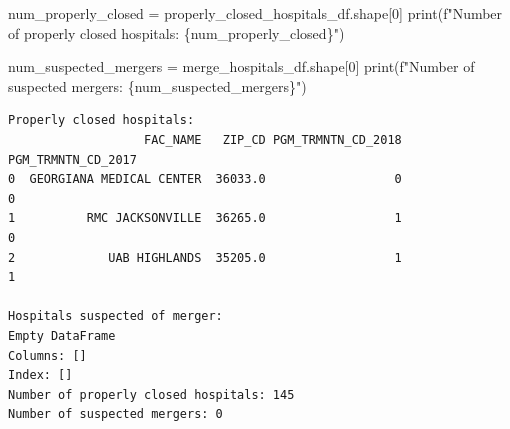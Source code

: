 \documentclass[
  letterpaper,
  DIV=11,
  numbers=noendperiod]{scrartcl}
\newenvironment{Shaded}{\begin{snugshade}}{\end{snugshade}}
\newcommand{\BuiltInTok}[1]{\textcolor[rgb]{0.00,0.23,0.31}{#1}}
\newcommand{\DecValTok}[1]{\textcolor[rgb]{0.68,0.00,0.00}{#1}}
\newcommand{\NormalTok}[1]{\textcolor[rgb]{0.00,0.23,0.31}{#1}}
\newcommand{\OperatorTok}[1]{\textcolor[rgb]{0.37,0.37,0.37}{#1}}
\newcommand{\SpecialCharTok}[1]{\textcolor[rgb]{0.37,0.37,0.37}{#1}}
\newcommand{\SpecialStringTok}[1]{\textcolor[rgb]{0.13,0.47,0.30}{#1}}
\begin{document}
\begin{Shaded}
\begin{Highlighting}[]
\NormalTok{num\_properly\_closed }\OperatorTok{=}\NormalTok{ properly\_closed\_hospitals\_df.shape[}\DecValTok{0}\NormalTok{]}
\BuiltInTok{print}\NormalTok{(}\SpecialStringTok{f"Number of properly closed hospitals: }\SpecialCharTok{\{}\NormalTok{num\_properly\_closed}\SpecialCharTok{\}}\SpecialStringTok{"}\NormalTok{)}

\NormalTok{num\_suspected\_mergers }\OperatorTok{=}\NormalTok{ merge\_hospitals\_df.shape[}\DecValTok{0}\NormalTok{]}
\BuiltInTok{print}\NormalTok{(}\SpecialStringTok{f"Number of suspected mergers: }\SpecialCharTok{\{}\NormalTok{num\_suspected\_mergers}\SpecialCharTok{\}}\SpecialStringTok{"}\NormalTok{)}
\end{Highlighting}
\end{Shaded}

\begin{verbatim}
Properly closed hospitals:
                   FAC_NAME   ZIP_CD PGM_TRMNTN_CD_2018 PGM_TRMNTN_CD_2017
0  GEORGIANA MEDICAL CENTER  36033.0                  0                  0
1          RMC JACKSONVILLE  36265.0                  1                  0
2             UAB HIGHLANDS  35205.0                  1                  1

Hospitals suspected of merger:
Empty DataFrame
Columns: []
Index: []
Number of properly closed hospitals: 145
Number of suspected mergers: 0
\end{verbatim}
\end{document}
